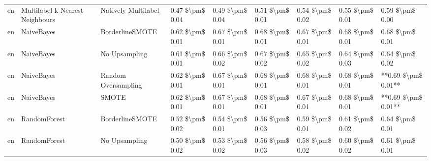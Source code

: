 \begin{tabular}{lllllllll}
      en & Multilabel k Nearest Neighbours &           Natively Multilabel & 0.47 \$\textbackslash pm\$ 0.04 &           0.49 \$\textbackslash pm\$ 0.04 &       0.51 \$\textbackslash pm\$ 0.01 &        0.54 \$\textbackslash pm\$ 0.02 &                         0.55 \$\textbackslash pm\$ 0.01 &     0.59 \$\textbackslash pm\$ 0.00 \\
      en &                      NaiveBayes &               BorderlineSMOTE & 0.62 \$\textbackslash pm\$ 0.01 &           0.67 \$\textbackslash pm\$ 0.01 &       0.68 \$\textbackslash pm\$ 0.01 &        0.67 \$\textbackslash pm\$ 0.01 &                         0.68 \$\textbackslash pm\$ 0.01 &     0.68 \$\textbackslash pm\$ 0.01 \\
      en &                      NaiveBayes &                 No Upsampling & 0.61 \$\textbackslash pm\$ 0.01 &           0.66 \$\textbackslash pm\$ 0.02 &       0.67 \$\textbackslash pm\$ 0.02 &        0.65 \$\textbackslash pm\$ 0.02 &                         0.64 \$\textbackslash pm\$ 0.03 &     0.64 \$\textbackslash pm\$ 0.02 \\
      en &                      NaiveBayes &           Random Oversampling & 0.62 \$\textbackslash pm\$ 0.01 &           0.67 \$\textbackslash pm\$ 0.01 &       0.68 \$\textbackslash pm\$ 0.01 &        0.68 \$\textbackslash pm\$ 0.01 &                         0.68 \$\textbackslash pm\$ 0.01 & **0.69 \$\textbackslash pm\$ 0.01** \\
      en &                      NaiveBayes &                         SMOTE & 0.62 \$\textbackslash pm\$ 0.01 &           0.67 \$\textbackslash pm\$ 0.01 &       0.68 \$\textbackslash pm\$ 0.01 &        0.67 \$\textbackslash pm\$ 0.01 &                         0.68 \$\textbackslash pm\$ 0.01 & **0.69 \$\textbackslash pm\$ 0.01** \\
      en &                    RandomForest &               BorderlineSMOTE & 0.52 \$\textbackslash pm\$ 0.02 &           0.54 \$\textbackslash pm\$ 0.01 &       0.56 \$\textbackslash pm\$ 0.03 &        0.59 \$\textbackslash pm\$ 0.01 &                         0.61 \$\textbackslash pm\$ 0.02 &     0.64 \$\textbackslash pm\$ 0.01 \\
      en &                    RandomForest &                 No Upsampling & 0.50 \$\textbackslash pm\$ 0.02 &           0.53 \$\textbackslash pm\$ 0.02 &       0.56 \$\textbackslash pm\$ 0.03 &        0.58 \$\textbackslash pm\$ 0.02 &                         0.60 \$\textbackslash pm\$ 0.02 &     0.61 \$\textbackslash pm\$ 0.01 \\

\end{tabular}
